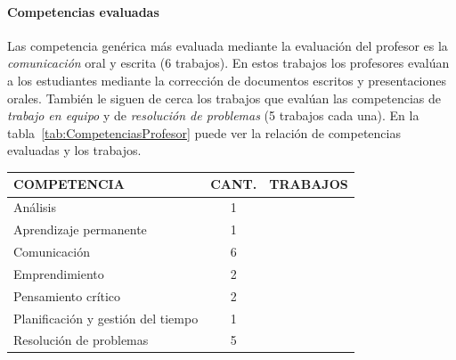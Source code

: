 \paragraph*{Competencias evaluadas}
Las competencia genérica más evaluada mediante la evaluación del profesor es la \emph{comunicación} oral y escrita (6 trabajos). En estos trabajos los profesores evalúan a los estudiantes mediante la corrección de documentos escritos y presentaciones orales. También le siguen de cerca los trabajos que evalúan las competencias de \emph{trabajo en equipo} y de \emph{resolución de problemas} (5 trabajos cada una). En la tabla~\ref{tab:CompetenciasProfesor} puede ver la relación de competencias evaluadas y los trabajos.

\begin{table}
  \begin{center}
  \begin{tabular}{| m{6cm} | c | m{5cm} |}
    \hline
    COMPETENCIA & CANT. & TRABAJOS\\
    \hline
    \hline
    Análisis & 1 & \cite{aziz2007appraisal} \\
    \hline
    Aprendizaje permanente & 1 & \cite{rashid2008engineering} \\
    \hline
    Comunicación & 6 &  \cite{lacuesta2009active,martin2013acquired,rodriguez2010portfolio,benlloch2007adapting,yang2014fine,rashid2008engineering} \\
    \hline
    Emprendimiento & 2 & \cite{ward2011developing,rashid2008engineering} \\
    \hline
    Pensamiento crítico & 2 & \cite{lacuesta2009active,aziz2007appraisal} \\
    \hline
    Planificación y gestión del tiempo & 1 & \cite{lacuesta2009active} \\
    \hline
    Resolución de problemas & 5 & \cite{martin2013acquired,rodriguez2010portfolio,benlloch2007adapting,vizcarro2013assessment,aziz2007appraisal} \\
    \hline

\end{tabular}
\end{center}
\end{table}
